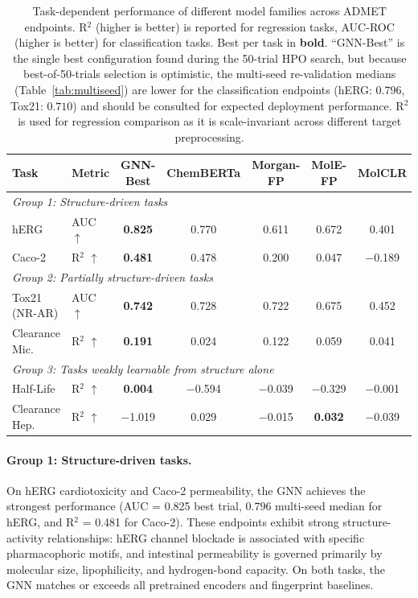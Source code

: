 \documentclass[journal]{IEEEtran}
\begin{document}
\begin{table}[!t]
\centering
\caption{Task-dependent performance of different model families across ADMET endpoints. R$^2$ (higher is better) is reported for regression tasks, AUC-ROC (higher is better) for classification tasks. Best per task in \textbf{bold}. ``GNN-Best'' is the single best configuration found during the 50-trial HPO search, but because best-of-50-trials selection is optimistic, the multi-seed re-validation medians (Table~\ref{tab:multiseed}) are lower for the classification endpoints (hERG: $0.796$, Tox21: $0.710$) and should be consulted for expected deployment performance. R$^2$ is used for regression comparison as it is scale-invariant across different target preprocessing.}
\label{tab:model_comparison}
\small
\begin{tabular}{llccccc}
\toprule
\textbf{Task} & \textbf{Metric} & \textbf{GNN-Best} & \textbf{ChemBERTa} & \textbf{Morgan-FP} & \textbf{MolE-FP} & \textbf{MolCLR} \\
\midrule
\multicolumn{7}{l}{\emph{Group 1: Structure-driven tasks}} \\
\midrule
hERG & AUC $\uparrow$ & \textbf{0.825} & 0.770 & 0.611 & 0.672 & 0.401 \\
Caco-2 & R$^2$ $\uparrow$ & \textbf{0.481} & 0.478 & 0.200 & 0.047 & $-$0.189 \\
\midrule
\multicolumn{7}{l}{\emph{Group 2: Partially structure-driven tasks}} \\
\midrule
Tox21 (NR-AR) & AUC $\uparrow$ & \textbf{0.742} & 0.728 & 0.722 & 0.675 & 0.452 \\
Clearance Mic. & R$^2$ $\uparrow$ & \textbf{0.191} & 0.024 & 0.122 & 0.059 & 0.041 \\
\midrule
\multicolumn{7}{l}{\emph{Group 3: Tasks weakly learnable from structure alone}} \\
\midrule
Half-Life & R$^2$ $\uparrow$ & \textbf{0.004} & $-$0.594 & $-$0.039 & $-$0.329 & $-$0.001 \\
Clearance Hep. & R$^2$ $\uparrow$ & $-$1.019 & 0.029 & $-$0.015 & \textbf{0.032} & $-$0.039 \\
\bottomrule
\end{tabular}
\end{table}

\paragraph{Group 1: Structure-driven tasks.}
On hERG cardiotoxicity and Caco-2 permeability, the GNN achieves the strongest performance (AUC = 0.825 best trial, $0.796$ multi-seed median for hERG, and R$^2$ = 0.481 for Caco-2). These endpoints exhibit strong structure-activity relationships: hERG channel blockade is associated with specific pharmacophoric motifs, and intestinal permeability is governed primarily by molecular size, lipophilicity, and hydrogen-bond capacity. On both tasks, the GNN matches or exceeds all pretrained encoders and fingerprint baselines.
\end{document}
